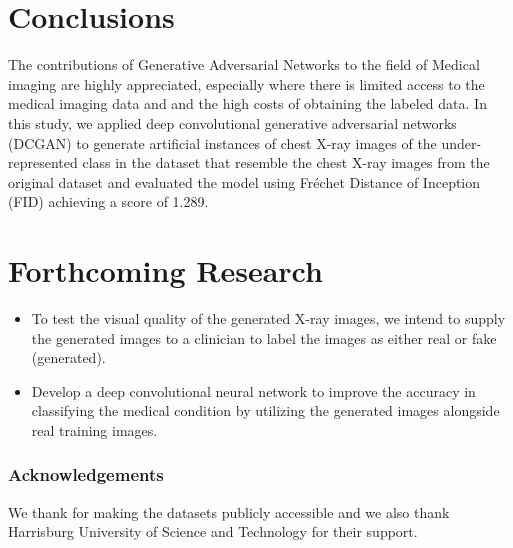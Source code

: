 \documentclass{article}
\begin{document}
\section*{Conclusions}

The contributions of Generative Adversarial Networks to the field of Medical imaging are highly appreciated, especially where there is limited access to the medical imaging data and and the high costs of obtaining  the labeled data. In this study, we applied deep convolutional generative adversarial networks (DCGAN) to generate artificial instances of chest X-ray images of the under-represented class in the dataset that resemble the chest X-ray images from the original dataset and evaluated the model using Fréchet Distance of Inception (FID) achieving a score of 1.289.




\section*{Forthcoming Research}

\begin{itemize}
\item To test the visual quality of the generated X-ray images, we intend to supply the generated images to a clinician to label the images as either real or fake (generated).
\item Develop a deep convolutional neural network to improve the accuracy in classifying the medical condition by utilizing the generated images alongside real training images.
\end{itemize}

\subsubsection*{Acknowledgements}

We thank \cite{kermany2018identifying} for making the datasets publicly accessible and we also thank Harrisburg University of Science and Technology for their support.

  
 
\end{document}
